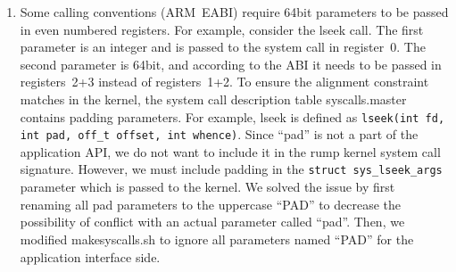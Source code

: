 \begin{enumerate}
\begin{figure}[t]
{\tt \scriptsize  
\begin{verbatim}
    [ .... ]
    2194:       e8 fc ff ff ff          call   2195 <rump___sysimpl_lseek+0x52>
    2199:       85 db                   test   %ebx,%ebx
    219b:       75 0c                   jne    21a9 <rump___sysimpl_lseek+0x66>
    219d:       8b 45 f4                mov    0xfffffff4(%ebp),%eax
    21a0:       8b 55 f8                mov    0xfffffff8(%ebp),%edx
    21a3:       83 c4 24                add    $0x24,%esp
    21a6:       5b                      pop    %ebx
    21a7:       5d                      pop    %ebp
    21a8:       c3                      ret    
    [ .... ]
\end{verbatim}}
\caption[Compile-time optimized \texttt{sizeof()} check]{
\textbf{Compile-time optimized \texttt{sizeof()} check.}
The assembly of the generated code compiled for i386 is presented.
}
\label{fig:lseekasm}
\end{figure}

	The above is not the only way to solve the problem.  The
	makesyscalls.sh script detects 64bit return values and
	sets the \verb+SYCALL_RET_64+ flag in a system call's
	description.  We could have hooked into the facility and created
	a special wrapper for lseek without the ``\texttt{if
	(sizeof())}'' clause.  The compiled code is the same for
	both approaches (Figure~\ref{fig:lseekasm}), so the choice
	is a matter of taste instead of runtime performance.

\item   Some calling conventions (\eg ARM~EABI) require
	64bit parameters to be passed in even numbered registers.
	For example, consider the lseek call.  The first parameter
	is an integer and is passed to the system call in register~0.
	The second parameter is 64bit, and according to the ABI
	it needs to be passed in registers~2+3 instead of registers~1+2.
	To ensure the alignment constraint matches in the kernel,
	the system call description table syscalls.master contains
	padding parameters.  For example, lseek is defined as
	\verb+lseek(int fd, int pad, off_t offset, int whence)+.
	Since ``pad'' is not a part of the application API, we
	do not want to include it in the rump kernel system call
	signature.  However, we must include padding in the
	\verb+struct sys_lseek_args+ parameter which is passed to
	the kernel.  We solved the issue by first renaming all pad
	parameters to the uppercase ``PAD'' to decrease the
	possibility of conflict with an actual parameter called
	``pad''.  Then, we modified makesyscalls.sh to ignore all
	parameters named ``PAD'' for the application interface
	side.
\end{enumerate}

